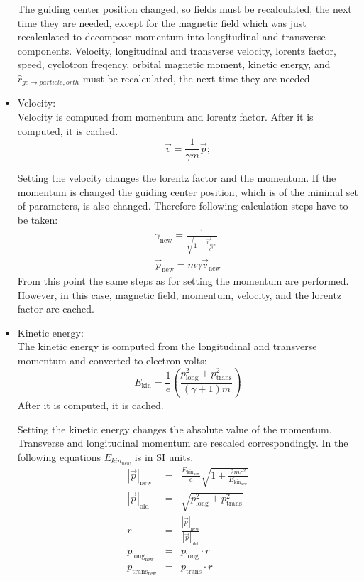 \begin{itemize}
		The guiding center position changed, so fields must be recalculated, the next time they are needed, except for the magnetic field which was just recalculated to decompose momentum into longitudinal and transverse components. Velocity, longitudinal and transverse velocity, lorentz factor, speed, cyclotron freqency, orbital magnetic moment, kinetic energy, and $\hat{r}_{gc \rightarrow particle, orth}$ must be recalculated, the next time they are needed. 
	
		\item Velocity:\\  
		Velocity is computed from momentum and lorentz factor. After it is computed, it is cached.
		\begin{equation}
			\vec{v} = \frac{1}{\gamma m} \vec{p};
		\end{equation}
		
		Setting the velocity changes the lorentz factor and the momentum. If the momentum is changed the guiding center position, which is of the minimal set of parameters, is also changed. Therefore following calculation steps have to be taken:
		\begin{eqnarray}
			\gamma_{\mathrm{new}} = \frac{1}{\sqrt{1-\frac{\vec{v}_{\mathrm{new}}^{2}}{c^{2}}}}\\
			\vec{p}_{\mathrm{new}} = m \gamma \vec{v}_{\mathrm{new}}
		\end{eqnarray}
		From this point the same steps as for setting the momentum are performed. However, in this case, magnetic field, momentum, velocity, and the lorentz factor are cached.

		\item Kinetic energy:\\
		The kinetic energy is computed from the longitudinal and transverse momentum and converted to electron volts:
		\begin{equation}
			E_{\mathrm{kin}} = \frac{1}{e}  \left( \frac{p_{\mathrm{long}}^{2}+p_{\mathrm{trans}}^{2}}{ \left( \gamma+1 \right) m}  \right)
		\end{equation}
		After it is computed, it is cached.              
		
		Setting the kinetic energy changes the absolute value of the momentum. Transverse and longitudinal momentum are rescaled correspondingly. In the following equations $E_{kin_{new}}$ is in SI units.	
		\begin{eqnarray}
		\label{rescaling}
			| \vec{p} |_{\mathrm{new}} &=& \frac{E_{\mathrm{kin}_{\mathrm{new}}}}{c}\sqrt{1+\frac{2mc^{2}}{E_{\mathrm{kin}_{\mathrm{new}}}}}\\
			| \vec{p} |_{\mathrm{old}} &=& \sqrt{p_{\mathrm{long}}^{2}+p_{\mathrm{trans}}^{2}}\\
			r &=& \frac{| \vec{p} |_{\mathrm{new}}}{| \vec{p} |_{\mathrm{old}}}\\
			p_{\mathrm{long}_{\mathrm{new}}} &=& p_{\mathrm{long}} \cdot r\\
			p_{\mathrm{trans}_{\mathrm{new}}} &=& p_{\mathrm{trans}} \cdot r              
		\end{eqnarray}


\end{itemize}
